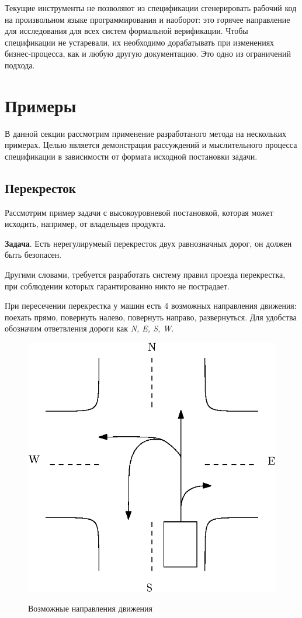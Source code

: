 \documentclass[14pt, openany]{report}
\begin{document}
Текущие инструменты не позволяют из спецификации сгенерировать рабочий код на произвольном языке программирования и наоборот: это горячее направление для исследования для всех систем формальной верификации. Чтобы спецификации не устаревали, их необходимо дорабатывать при изменениях бизнес-процесса, как и любую другую документацию. Это одно из ограничений подхода.

\section{Примеры}
В данной секции рассмотрим применение разработаного метода на нескольких примерах.
Целью является демонстрация рассуждений и мыслительного процесса спецификации в зависимости от формата исходной постановки задачи.

\subsection{Перекресток}
Рассмотрим пример задачи с высокоуровневой постановкой, которая может исходить, например, от владельцев продукта.

\textbf{Задача}. Есть нерегулирумеый перекресток двух равнозначных дорог, он должен быть безопасен.

Другими словами, требуется разработать систему правил проезда перекрестка, при соблюдении которых гарантированно никто не пострадает.

При пересечении перекрестка у машин есть 4 возможных направления движения: поехать прямо, повернуть налево, повернуть направо, развернуться. Для удобства обозначим ответвления дороги как \emph{N, E, S, W}. 

\begin{figure}[t]
\centering
\includegraphics{crossroads}
\label{fig:crossroads}
\caption{Возможные направления движения}
\end{figure}
\end{document}

